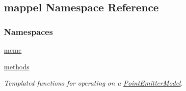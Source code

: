 \hypertarget{namespacemappel}{}\subsection{mappel Namespace Reference}
\label{namespacemappel}
\subsubsection*{Namespaces}
\begin{DoxyCompactItemize}
\item 
 \hyperlink{namespacemappel_1_1mcmc}{mcmc}
\item 
 \hyperlink{namespacemappel_1_1methods}{methods}
\begin{DoxyCompactList}\small\item\em Templated functions for operating on a \hyperlink{classmappel_1_1PointEmitterModel}{Point\+Emitter\+Model}. \end{DoxyCompactList}\end{DoxyCompactItemize}
